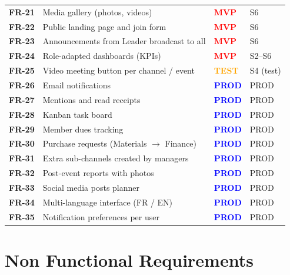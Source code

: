 \documentclass[12pt,a4paper]{report}
\newcommand{\vprio}{\textcolor{red}{\textbf{MVP}}}
\newcommand{\pprio}{\textcolor{blue}{\textbf{PROD}}}
\newcommand{\testprio}{\textcolor{orange}{\textbf{TEST}}}
\begin{document}
\begin{longtable}{>{\bfseries}p{1.4cm} p{9.2cm} p{2.4cm} p{1.6cm}}
FR-21 & Media gallery (photos, videos) & \vprio & S6 \\
FR-22 & Public landing page and join form & \vprio & S6 \\
FR-23 & Announcements from Leader broadcast to all & \vprio & S6 \\
FR-24 & Role-adapted dashboards (KPIs) & \vprio & S2--S6 \\
FR-25 & Video meeting button per channel / event & \testprio & S4 (test) \\
FR-26 & Email notifications & \pprio & PROD \\
FR-27 & Mentions and read receipts & \pprio & PROD \\
FR-28 & Kanban task board & \pprio & PROD \\
FR-29 & Member dues tracking & \pprio & PROD \\
FR-30 & Purchase requests (Materials $\rightarrow$ Finance) & \pprio & PROD \\
FR-31 & Extra sub-channels created by managers & \pprio & PROD \\
FR-32 & Post-event reports with photos & \pprio & PROD \\
FR-33 & Social media posts planner & \pprio & PROD \\
FR-34 & Multi-language interface (FR / EN) & \pprio & PROD \\
FR-35 & Notification preferences per user & \pprio & PROD \\
\bottomrule
\end{longtable}

\section{Non Functional Requirements}
\end{document}

